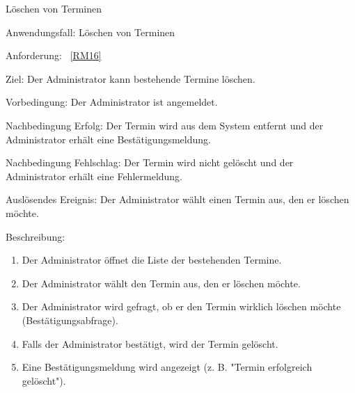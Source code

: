 \begin{function}{30}{Löschen von Terminen}
    \item[Anwendungsfall:] Löschen von Terminen
    \item[Anforderung:] ~\ref{RM16}
    \item[Ziel:] Der Administrator kann bestehende Termine löschen.
    \item[Vorbedingung:] Der Administrator ist angemeldet.
    \item[Nachbedingung Erfolg:] Der Termin wird aus dem System entfernt und der Administrator erhält eine Bestätigungsmeldung.
    \item[Nachbedingung Fehlschlag:] Der Termin wird nicht gelöscht und der Administrator erhält eine Fehlermeldung.
    \item[Auslösendes Ereignis:] Der Administrator wählt einen Termin aus, den er löschen möchte.
    \item[Beschreibung:] ~
    \begin{enumerate}
        \item Der Administrator öffnet die Liste der bestehenden Termine.
        \item Der Administrator wählt den Termin aus, den er löschen möchte.
        \item Der Administrator wird gefragt, ob er den Termin wirklich löschen möchte (Bestätigungsabfrage).
        \item Falls der Administrator bestätigt, wird der Termin gelöscht.
        \item Eine Bestätigungsmeldung wird angezeigt (z. B. "Termin erfolgreich gelöscht").
    \end{enumerate}
\end{function}

